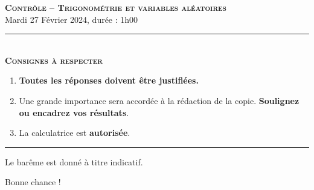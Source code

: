\documentclass[11pt]{article}
\begin{document}
%
%
%
%
%

\begin{center}
\textbf{\LARGE \textsc{Contrôle -- Trigonométrie et variables aléatoires}}\\[2mm]

{\large Mardi 27 Février 2024, durée : 1h00}\\[1mm]
\noindent\rule{8cm}{0.4pt}\\[1mm]
\textbf{\textsc{Consignes à respecter}}
\begin{enumerate}[label=\textbf{\arabic*/}]
\item \textbf{Toutes les réponses doivent être justifiées.}
\item Une grande importance sera accordée à la rédaction de la
  copie. \textbf{Soulignez ou encadrez vos résultats}.
\item La calculatrice est \textbf{autorisée}.
    \end{enumerate}
\noindent\rule{12cm}{0.4pt}
\end{center}

\noindent Le barême est donné à titre indicatif.
\begin{center}
  Bonne chance !
\end{center}
\end{document}

